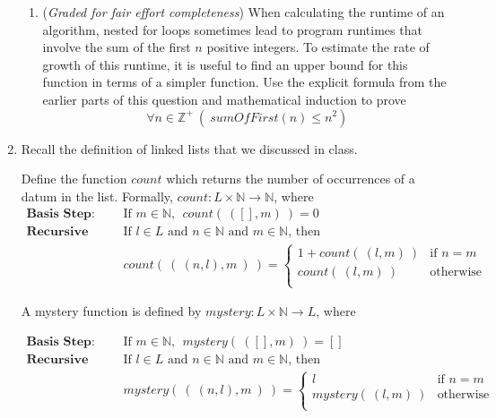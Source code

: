 \begin{enumerate}
\begin{enumerate}
        \item ({\it Graded for fair effort completeness})
        When calculating the runtime of an algorithm, nested for loops sometimes lead to program 
        runtimes that involve the sum of the first $n$ positive integers. To estimate
        the rate of growth of this runtime, it is useful to find an upper bound for this function 
        in terms of a simpler function.  Use the explicit formula from the earlier parts of this question
        and mathematical induction to prove
        \[
            \forall n \in \mathbb{Z}^+~ \left(~sumOfFirst(n) \leq n^2 \right)
        \]

   \end{enumerate}

   \item Recall the definition of linked lists that we discussed in class.


   Define the function $count$ which returns the number of occurrences of a datum
   in the list. Formally, $count: L \times \mathbb{N} \to \mathbb{N}$, where
   \begin{align*}
    \textbf{Basis Step:} \qquad &\textrm{If } m \in \mathbb{N},~~ count(~( [], m)~ ) = 0 \\ 
    \textbf{Recursive Step:} \qquad &\textrm{If } l \in L\textrm{ and }n \in \mathbb{N}
    \textrm{ and }m \in \mathbb{N} \textrm{, then  } \\
    &count(~(~(n, l),m~)~ ) = 
        \begin{cases}
            1 + count(~(l,m)~) &\text{if $n=m$} \\
            count(~(l,m)~) &\text{otherwise} \\
        \end{cases}
    \end{align*}

    A mystery function is defined by 
    $mystery : L \times \mathbb{N} \to L$, where

    \begin{align*}
    \textbf{Basis Step:} \qquad &\textrm{If } m \in \mathbb{N},~~ mystery(~( [], m)~ ) = [] \\ 
    \textbf{Recursive Step:} \qquad &\textrm{If } l \in L\textrm{ and }n \in \mathbb{N}
    \textrm{ and }m \in \mathbb{N} \textrm{, then  } \\
    &mystery(~(~(n, l),m~)~ ) = 
        \begin{cases}
            l &\text{if $n=m$} \\
            mystery(~(l,m)~) &\text{otherwise} \\
        \end{cases}
    \end{align*}


\end{enumerate}

